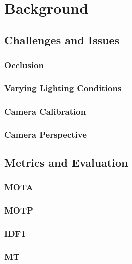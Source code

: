 \chapter{Background}\label{chap:background}

\section{Challenges and Issues}\label{sec:challenges_and_issues}

\subsection{Occlusion}\label{subsec:occlusion}

\subsection{Varying Lighting Conditions}\label{subsec:varying_lighting_conditions}

\subsection{Camera Calibration}\label{subsec:camera_calibration}

\subsection{Camera Perspective}\label{subsec:camera_perspective}

\section{Metrics and Evaluation}\label{sec:metrics_and_evaluation}

\subsection{MOTA}\label{subsec:mota}

\subsection{MOTP}\label{subsec:motp}

\subsection{IDF1}\label{subsec:idf1}

\subsection{MT}\label{subsec:mt}

